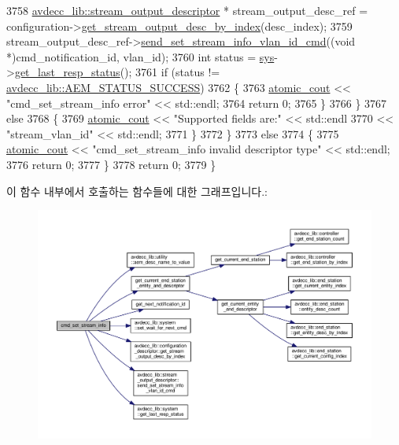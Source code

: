 \begin{DoxyCode}
3758             \hyperlink{classavdecc__lib_1_1stream__output__descriptor}{avdecc\_lib::stream\_output\_descriptor} * 
      stream\_output\_desc\_ref = configuration->\hyperlink{classavdecc__lib_1_1configuration__descriptor_a300ea5957342e2e9579318135da02856}{get\_stream\_output\_desc\_by\_index}(desc\_index);
3759             stream\_output\_desc\_ref->\hyperlink{classavdecc__lib_1_1stream__output__descriptor_ac68755a252c54347ac7ec516133081a9}{send\_set\_stream\_info\_vlan\_id\_cmd}((\textcolor{keywordtype}{void} 
      *)cmd\_notification\_id, vlan\_id);
3760             \textcolor{keywordtype}{int} status = \hyperlink{classcmd__line_a485db4800e331cb4052c447fdf5d154e}{sys}->\hyperlink{classavdecc__lib_1_1system_aa63e8d1a4e51f695cdcccc9340922407}{get\_last\_resp\_status}();
3761             \textcolor{keywordflow}{if} (status != \hyperlink{namespaceavdecc__lib_affd436edb2cecd20cfd784a84f852b2bac947077909cb590b84f4b5db413080e0}{avdecc\_lib::AEM\_STATUS\_SUCCESS})
3762             \{
3763                 \hyperlink{cmd__line_8h_a0bc38ccc65c79ba06c6fcd7b4bf554c3}{atomic\_cout} << \textcolor{stringliteral}{"cmd\_set\_stream\_info error"} << std::endl;
3764                 \textcolor{keywordflow}{return} 0;
3765             \}
3766         \}
3767         \textcolor{keywordflow}{else}
3768         \{
3769             \hyperlink{cmd__line_8h_a0bc38ccc65c79ba06c6fcd7b4bf554c3}{atomic\_cout} << \textcolor{stringliteral}{"Supported fields are:"} << std::endl
3770                         << \textcolor{stringliteral}{"stream\_vlan\_id"} << std::endl;
3771         \}
3772     \}
3773     \textcolor{keywordflow}{else}
3774     \{
3775         \hyperlink{cmd__line_8h_a0bc38ccc65c79ba06c6fcd7b4bf554c3}{atomic\_cout} << \textcolor{stringliteral}{"cmd\_set\_stream\_info invalid descriptor type"} << std::endl;
3776         \textcolor{keywordflow}{return} 0;
3777     \}
3778     \textcolor{keywordflow}{return} 0;
3779 \}
\end{DoxyCode}


이 함수 내부에서 호출하는 함수들에 대한 그래프입니다.\+:
\nopagebreak
\begin{figure}[H]
\begin{center}
\leavevmode
\includegraphics[width=350pt]{classcmd__line_ab0e730e5b0378ee260dea25ba8eed459_cgraph}
\end{center}
\end{figure}




